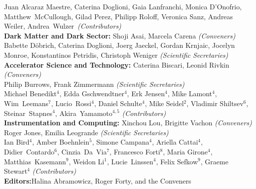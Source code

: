 {\begin{center}
Juan Alcaraz Maestre, Caterina Doglioni, Gaia Lanfranchi, Monica D'Onofrio, Matthew~McCullough, Gilad Perez, Philipp Roloff, Veronica Sanz, Andreas Weiler, Andrea~Wulzer~{\it(Contributors)} \\
{\vspace*{3mm}\bf Dark Matter and Dark Sector:}\quad
Shoji Asai, Marcela Carena {\it (Conveners)} \\
Babette D\"{o}brich, Caterina Doglioni, Joerg Jaeckel, Gordan Krnjaic, Jocelyn Monroe, Konstantinos Petridis, Christoph Weniger {\it (Scientific Secretaries)} \\
{\vspace*{3mm}\bf Accelerator Science and Technology:}\quad
Caterina Biscari, Leonid Rivkin {\it (Conveners)} \\
Philip Burrows, Frank Zimmermann {\it (Scientific Secretaries)}  \\
Michael Benedikt$^4$, Edda Gschwendtner$^4$, Erk Jensen$^{4}$, Mike Lamont$^{4}$,  Wim~Leemans$^7$,  Lucio~Rossi$^4$, Daniel Schulte$^4$, Mike Seidel$^2$, Vladimir Shiltsev$^6$, 
Steinar~Stapnes$^4$,  Akira~Yamamoto$^{4,5}$ {\it (Contributors)} \\
{\vspace*{3mm}\bf Instrumentation and Computing:}\quad
Xinchou Lou, Brigitte Vachon {\it (Conveners)} \\
Roger Jones, Emilia Leogrande {\it (Scientific Secretaries)} \\
Ian Bird$^4$, Amber Boehnlein$^5$, Simone Campana$^4$, Ariella Cattai$^4$, Didier~Contardo$^6$, Cinzia~Da~Via$^7$, Francesco Forti$^8$,  Maria Girone$^4$, Matthias~Kasemann$^9$, Weidon Li$^1$, Lucie~Linssen$^4$, Felix Sefkow$^9$, Graeme Stewart$^4$ {\it (Contributors)} \\
\vspace*{5mm}
{\bf Editors:\quad}Halina Abramowicz, Roger Forty, and the Conveners
\end{center}}

